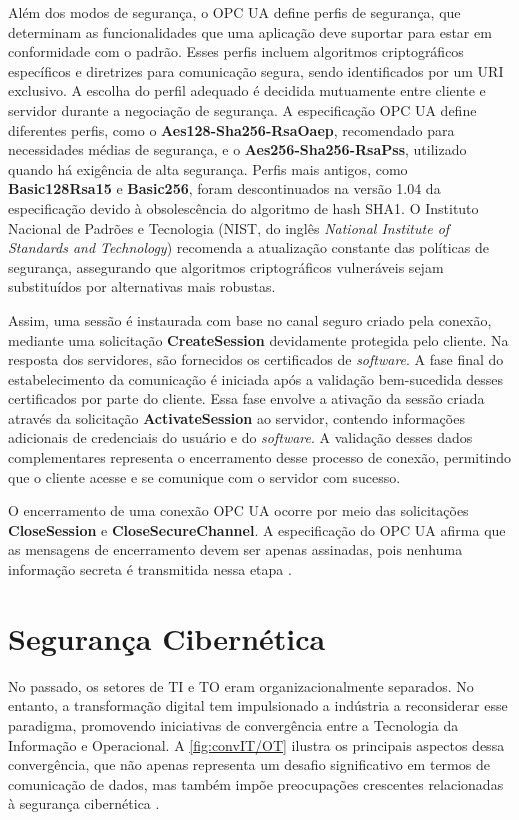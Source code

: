         Além dos modos de segurança, o OPC UA define perfis de segurança, que determinam as funcionalidades que uma aplicação deve suportar para estar em conformidade com o padrão. Esses perfis incluem algoritmos criptográficos específicos e diretrizes para comunicação segura, sendo identificados por um URI exclusivo. A escolha do perfil adequado é decidida mutuamente entre cliente e servidor durante a negociação de segurança. A especificação OPC UA define diferentes perfis, como o \textbf{Aes128-Sha256-RsaOaep}, recomendado para necessidades médias de segurança, e o \textbf{Aes256-Sha256-RsaPss}, utilizado quando há exigência de alta segurança. Perfis mais antigos, como \textbf{Basic128Rsa15} e \textbf{Basic256}, foram descontinuados na versão 1.04 da especificação devido à obsolescência do algoritmo de hash SHA1. O Instituto Nacional de Padrões e Tecnologia (NIST, do inglês \textit{National Institute of Standards and Technology}) recomenda a atualização constante das políticas de segurança, assegurando que algoritmos criptográficos vulneráveis sejam substituídos por alternativas mais robustas.

        Assim, uma sessão é instaurada com base no canal seguro criado pela conexão, mediante uma solicitação \textbf{CreateSession} devidamente protegida pelo cliente. Na resposta dos servidores, são fornecidos os certificados de \textit{software}. A fase final do estabelecimento da comunicação é iniciada após a validação bem-sucedida desses certificados por parte do cliente. Essa fase envolve a ativação da sessão criada através da solicitação \textbf{ActivateSession} ao servidor, contendo informações adicionais de credenciais do usuário e do \textit{software}. A validação desses dados complementares representa o encerramento desse processo de conexão, permitindo que o cliente acesse e se comunique com o servidor com sucesso.

        O encerramento de uma conexão OPC UA ocorre por meio das solicitações \textbf{CloseSession} e \textbf{CloseSecureChannel}. A especificação do OPC UA afirma que as mensagens de encerramento devem ser apenas assinadas, pois nenhuma informação secreta é transmitida nessa etapa \cite{opc2024}.

\section{Segurança Cibernética} \label{sec:cybersecurity}

    No passado, os setores de TI e TO eram organizacionalmente separados. No entanto, a transformação digital tem impulsionado a indústria a reconsiderar esse paradigma, promovendo iniciativas de convergência entre a Tecnologia da Informação e Operacional. A \autoref{fig:convIT/OT} ilustra os principais aspectos dessa convergência, que não apenas representa um desafio significativo em termos de comunicação de dados, mas também impõe preocupações crescentes relacionadas à segurança cibernética \cite{wiboonrat2022}.

